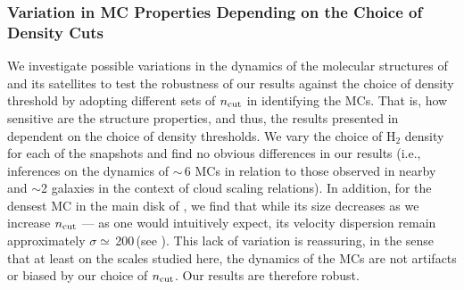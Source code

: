 \IfFileExists{emulateapjlegacy.cls}{\documentclass[iop]{emulateapjlegacy}}{\documentclass[iop]{emulateapj}}
\begin{document}
\subsubsection{Variation in MC Properties Depending on the Choice of Density Cuts}	 \label{sec:ncut}
We investigate possible variations in the dynamics of the molecular structures of \flower and its satellites
to test
the robustness of our results against the choice of density threshold by adopting
different sets of $n_{\rm cut}$ in identifying the MCs.
That is, how sensitive are the structure properties, and thus, the results presented in 
dependent on the choice of density thresholds.
We vary the choice of H$_2$ density for each of the snapshots and
find no obvious differences in our results (i.e., inferences on the dynamics of \z$\sim$\,6
MCs in relation to those observed in nearby and \z$\sim$2 galaxies in the context of
cloud scaling relations).
In addition, for the densest MC in the main disk of \flower, we find that while
its size decreases as we increase $n_{\rm cut}$ --- as one would intuitively expect,
its velocity dispersion remain
approximately $\sigma\simeq$\,200\,\kms (see ).
This lack of variation is reassuring, in the sense that at least on the scales studied here,
the dynamics of the MCs are not artifacts or biased by our choice of $n_{\rm cut}$.
Our results are therefore robust.
\end{document}
